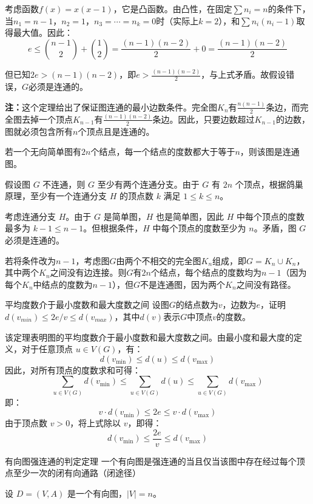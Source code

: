 考虑函数$f(x) = x(x-1)$，它是凸函数。由凸性，在固定$\sum n_i = n$的条件下，当$n_1 = n-1$，$n_2 = 1$，$n_3 = \cdots = n_k = 0$时（实际上$k=2$），和$\sum n_i(n_i-1)$取得最大值。因此：
\[
e \leqslant \binom{n-1}{2} + \binom{1}{2} = \frac{(n-1)(n-2)}{2} + 0 = \frac{(n-1)(n-2)}{2}
\]

但已知$2e > (n-1)(n-2)$，即$e > \frac{(n-1)(n-2)}{2}$，与上式矛盾。故假设错误，$G$必须是连通的。

\textbf{注：}这个定理给出了保证图连通的最小边数条件。完全图$K_n$有$\frac{n(n-1)}{2}$条边，而完全图去掉一个顶点$K_{n-1}$有$\frac{(n-1)(n-2)}{2}$条边。因此，只要边数超过$K_{n-1}$的边数，图就必须包含所有$n$个顶点且是连通的。
\begin{example}{}{}
    若一个无向简单图有$2n$个结点，每一个结点的度数都大于等于$n$，则该图是连通图。
\end{example}
假设图 $G$ 不连通，则 $G$ 至少有两个连通分支。由于 $G$ 有 $2n$ 个顶点，根据鸽巢原理，至少有一个连通分支 $H$ 的顶点数 $k$ 满足 $1 \leqslant k \leqslant n$。
    
考虑连通分支 $H$。由于 $G$ 是简单图，$H$ 也是简单图，因此 $H$ 中每个顶点的度数最多为 $k-1\leqslant n-1$。但根据条件，$H$ 中每个顶点的度数至少为 $n$。矛盾，图 $G$ 必须是连通的。

若将条件改为$n-1$，考虑图$G$由两个不相交的完全图$K_n$组成，即$G = K_n \cup K_n$，其中两个$K_n$之间没有边连接。则$G$有$2n$个结点，每个结点的度数均为$n-1$（因为每个$K_n$中结点的度数为$n-1$），但$G$不是连通图，因为两个$K_n$之间没有路径。
\begin{theorem}{平均度数介于最小度数和最大度数之间}{}
    设图$G$的结点数为$v$，边数为$e$，证明$d(v_{min})\leqslant 2e/v\leqslant d(v_{max})$，其中$d(v)$表示$G$中顶点$v$的度数。
\end{theorem}
该定理表明图的平均度数介于最小度数和最大度数之间。由最小度和最大度的定义，对于任意顶点 $u \in V(G)$，有：
    \[
    d(v_{\text{min}}) \leqslant d(u) \leqslant d(v_{\text{max}})
    \]
    因此，对所有顶点的度数求和可得：
    \[
    \sum_{u \in V(G)} d(v_{\text{min}}) \leqslant \sum_{u \in V(G)} d(u) \leqslant \sum_{u \in V(G)} d(v_{\text{max}})
    \]
    即：
    \[
    v \cdot d(v_{\text{min}}) \leqslant 2e \leqslant v \cdot d(v_{\text{max}})
    \]
    由于顶点数 $v > 0$，将上式除以 $v$，即得：
    \[
    d(v_{\text{min}}) \leqslant \frac{2e}{v} \leqslant d(v_{\text{max}})
    \]
\begin{theorem}{有向图强连通的判定定理}{}
    一个有向图是强连通的当且仅当该图中存在经过每个顶点至少一次的闭有向通路（闭途径）
\end{theorem}
设 $D = (V, A)$ 是一个有向图，$|V| = n$。


